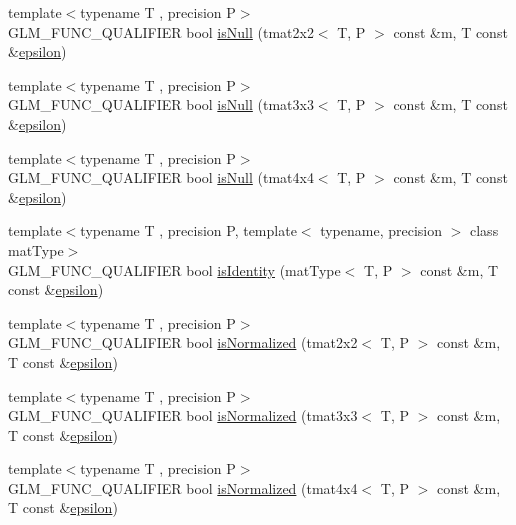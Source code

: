 \begin{DoxyCompactItemize}
\item 
{\footnotesize template$<$typename T , precision P$>$ }\\G\+L\+M\+\_\+\+F\+U\+N\+C\+\_\+\+Q\+U\+A\+L\+I\+F\+I\+E\+R bool \hyperlink{group__gtx__matrix__query_ga37e535cbeaea383b8c1247b98875cd4b}{is\+Null} (tmat2x2$<$ T, P $>$ const \&m, T const \&\hyperlink{group__gtc__constants_ga2a1e57fc5592b69cfae84174cbfc9429}{epsilon})
\item 
{\footnotesize template$<$typename T , precision P$>$ }\\G\+L\+M\+\_\+\+F\+U\+N\+C\+\_\+\+Q\+U\+A\+L\+I\+F\+I\+E\+R bool \hyperlink{group__gtx__matrix__query_gac67a5c7e029a84b74b02ac9599b8972d}{is\+Null} (tmat3x3$<$ T, P $>$ const \&m, T const \&\hyperlink{group__gtc__constants_ga2a1e57fc5592b69cfae84174cbfc9429}{epsilon})
\item 
{\footnotesize template$<$typename T , precision P$>$ }\\G\+L\+M\+\_\+\+F\+U\+N\+C\+\_\+\+Q\+U\+A\+L\+I\+F\+I\+E\+R bool \hyperlink{group__gtx__matrix__query_ga326de496972051413c7b44b85fc9cb6e}{is\+Null} (tmat4x4$<$ T, P $>$ const \&m, T const \&\hyperlink{group__gtc__constants_ga2a1e57fc5592b69cfae84174cbfc9429}{epsilon})
\item 
{\footnotesize template$<$typename T , precision P, template$<$ typename, precision $>$ class mat\+Type$>$ }\\G\+L\+M\+\_\+\+F\+U\+N\+C\+\_\+\+Q\+U\+A\+L\+I\+F\+I\+E\+R bool \hyperlink{group__gtx__matrix__query_gafc1ce12c738b8c5d007179e615609330}{is\+Identity} (mat\+Type$<$ T, P $>$ const \&m, T const \&\hyperlink{group__gtc__constants_ga2a1e57fc5592b69cfae84174cbfc9429}{epsilon})
\item 
{\footnotesize template$<$typename T , precision P$>$ }\\G\+L\+M\+\_\+\+F\+U\+N\+C\+\_\+\+Q\+U\+A\+L\+I\+F\+I\+E\+R bool \hyperlink{group__gtx__matrix__query_ga11a8d5cdb36496b85f61e4f5f7f2602c}{is\+Normalized} (tmat2x2$<$ T, P $>$ const \&m, T const \&\hyperlink{group__gtc__constants_ga2a1e57fc5592b69cfae84174cbfc9429}{epsilon})
\item 
{\footnotesize template$<$typename T , precision P$>$ }\\G\+L\+M\+\_\+\+F\+U\+N\+C\+\_\+\+Q\+U\+A\+L\+I\+F\+I\+E\+R bool \hyperlink{group__gtx__matrix__query_ga351bcc8d485d329b78cfa875e084964d}{is\+Normalized} (tmat3x3$<$ T, P $>$ const \&m, T const \&\hyperlink{group__gtc__constants_ga2a1e57fc5592b69cfae84174cbfc9429}{epsilon})
\item 
{\footnotesize template$<$typename T , precision P$>$ }\\G\+L\+M\+\_\+\+F\+U\+N\+C\+\_\+\+Q\+U\+A\+L\+I\+F\+I\+E\+R bool \hyperlink{group__gtx__matrix__query_ga934b673ec0e16d79eca0ca9dbb5d6d8b}{is\+Normalized} (tmat4x4$<$ T, P $>$ const \&m, T const \&\hyperlink{group__gtc__constants_ga2a1e57fc5592b69cfae84174cbfc9429}{epsilon})

\end{DoxyCompactItemize}
